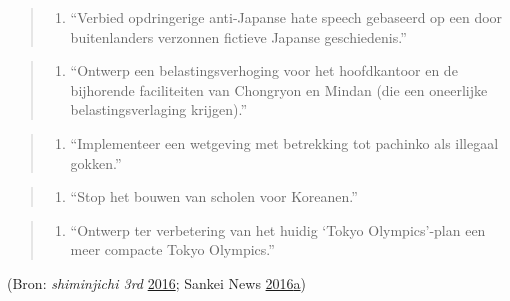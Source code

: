 \documentclass[10.5pt,dutch,]{article}
\providecommand{\tightlist}{%
  \setlength{\itemsep}{0pt}\setlength{\parskip}{0pt}}
\begin{document}
\begin{quote}
\begin{enumerate}
\def\labelenumi{\arabic{enumi}.}
\setcounter{enumi}{2}
\tightlist
\item
  ``Verbied opdringerige anti-Japanse hate speech gebaseerd op een door
  buitenlanders verzonnen fictieve Japanse geschiedenis.''
\end{enumerate}
\end{quote}

\begin{quote}
\begin{enumerate}
\def\labelenumi{\arabic{enumi}.}
\setcounter{enumi}{3}
\tightlist
\item
  ``Ontwerp een belastingsverhoging voor het hoofdkantoor en de
  bijhorende faciliteiten van Chongryon en Mindan (die een oneerlijke
  belastingsverlaging krijgen).''
\end{enumerate}
\end{quote}

\begin{quote}
\begin{enumerate}
\def\labelenumi{\arabic{enumi}.}
\setcounter{enumi}{4}
\tightlist
\item
  ``Implementeer een wetgeving met betrekking tot pachinko als illegaal
  gokken.''
\end{enumerate}
\end{quote}

\begin{quote}
\begin{enumerate}
\def\labelenumi{\arabic{enumi}.}
\setcounter{enumi}{5}
\tightlist
\item
  ``Stop het bouwen van scholen voor Koreanen.''
\end{enumerate}
\end{quote}

\begin{quote}
\begin{enumerate}
\def\labelenumi{\arabic{enumi}.}
\setcounter{enumi}{6}
\tightlist
\item
  ``Ontwerp ter verbetering van het huidig `Tokyo Olympics'-plan een
  meer compacte Tokyo Olympics.''
\end{enumerate}
\end{quote}

(Bron: \emph{shiminjichi 3rd}
\protect\hyperlink{ref-shiminjichiux5f3rdux5ftokyochijiux5f2016}{2016};
Sankei News
\protect\hyperlink{ref-sankeiux5fnewsux5ftokyochiji-senux5f2016}{2016}\protect\hyperlink{ref-sankeiux5fnewsux5ftokyochiji-senux5f2016}{a})
\end{document}
